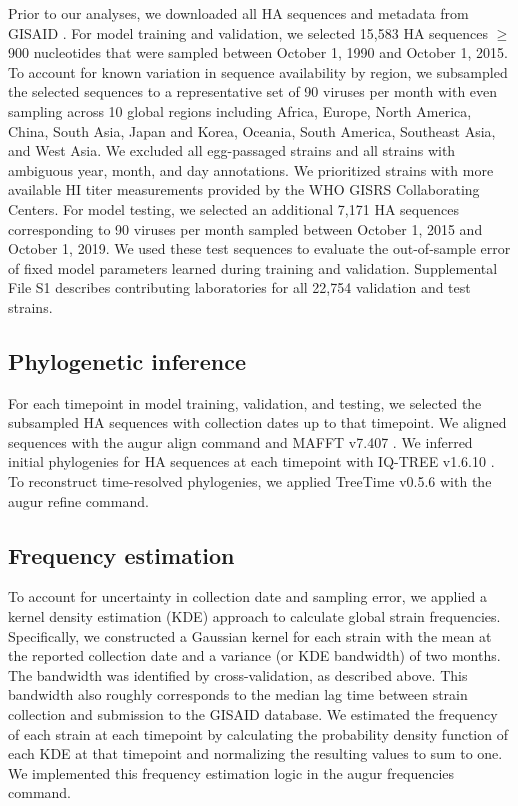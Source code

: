 Prior to our analyses, we downloaded all HA sequences and metadata from GISAID \cite{shu2017gisaid}.
For model training and validation, we selected 15,583 HA sequences $\geq$900 nucleotides that were sampled between October 1, 1990 and October 1, 2015.
To account for known variation in sequence availability by region, we subsampled the selected sequences to a representative set of 90 viruses per month with even sampling across 10 global regions including Africa, Europe, North America, China, South Asia, Japan and Korea, Oceania, South America, Southeast Asia, and West Asia.
We excluded all egg-passaged strains and all strains with ambiguous year, month, and day annotations.
We prioritized strains with more available HI titer measurements provided by the WHO GISRS Collaborating Centers.
For model testing, we selected an additional 7,171 HA sequences corresponding to 90 viruses per month sampled between October 1, 2015 and October 1, 2019.
We used these test sequences to evaluate the out-of-sample error of fixed model parameters learned during training and validation.
Supplemental File S1 describes contributing laboratories for all 22,754 validation and test strains.

\subsection*{Phylogenetic inference}

For each timepoint in model training, validation, and testing, we selected the subsampled HA sequences with collection dates up to that timepoint.
We aligned sequences with the augur align command \cite{Hadfield2018} and MAFFT v7.407 \cite{Katoh2002}.
We inferred initial phylogenies for HA sequences at each timepoint with IQ-TREE v1.6.10 \cite{Nguyen2014}.
To reconstruct time-resolved phylogenies, we applied TreeTime v0.5.6 \cite{Sagulenko2018} with the augur refine command.

\subsection*{Frequency estimation}

To account for uncertainty in collection date and sampling error, we applied a kernel density estimation (KDE) approach to calculate global strain frequencies.
Specifically, we constructed a Gaussian kernel for each strain with the mean at the reported collection date and a variance (or KDE bandwidth) of two months.
The bandwidth was identified by cross-validation, as described above.
This bandwidth also roughly corresponds to the median lag time between strain collection and submission to the GISAID database.
We estimated the frequency of each strain at each timepoint by calculating the probability density function of each KDE at that timepoint and normalizing the resulting values to sum to one.
We implemented this frequency estimation logic in the augur frequencies command.

